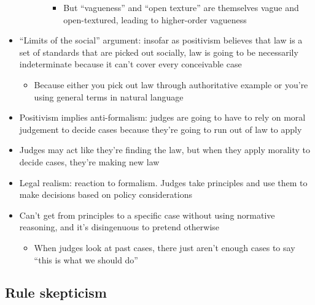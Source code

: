 \begin{itemize}
\begin{itemize}
\begin{itemize}
      \begin{itemize}
      \tightlist
      \item
        But ``vagueness'' and ``open texture'' are themselves vague and
        open-textured, leading to higher-order vagueness
      \end{itemize}
    \end{itemize}
  \end{itemize}
\item
  ``Limits of the social'' argument: insofar as positivism believes that
  law is a set of standards that are picked out socially, law is going
  to be necessarily indeterminate because it can't cover every
  conceivable case

  \begin{itemize}
  \tightlist
  \item
    Because either you pick out law through authoritative example or
    you're using general terms in natural language
  \end{itemize}
\item
  Positivism implies anti-formalism: judges are going to have to rely on
  moral judgement to decide cases because they're going to run out of
  law to apply
\item
  Judges may act like they're finding the law, but when they apply
  morality to decide cases, they're making new law
\item
  Legal realism: reaction to formalism. Judges take principles and use
  them to make decisions based on policy considerations
\item
  Can't get from principles to a specific case without using normative
  reasoning, and it's disingenuous to pretend otherwise

  \begin{itemize}
  \tightlist
  \item
    When judges look at past cases, there just aren't enough cases to
    say ``this is what we should do''
  \end{itemize}
\end{itemize}

\hypertarget{rule-skepticism}{%
\subsection{Rule skepticism}\label{rule-skepticism}}


